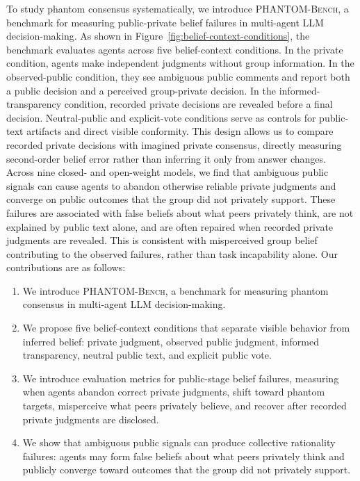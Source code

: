 \documentclass{article}
\begin{document}
To study phantom consensus systematically, we introduce \textsc{PHANTOM-Bench}, a benchmark for measuring public-private belief failures in multi-agent LLM decision-making. As shown in Figure~\ref{fig:belief-context-conditions}, the benchmark evaluates agents across five belief-context conditions. In the private condition, agents make independent judgments without group information. In the observed-public condition, they see ambiguous public comments and report both a public decision and a perceived group-private decision. In the informed-transparency condition, recorded private decisions are revealed before a final decision. Neutral-public and explicit-vote conditions serve as controls for public-text artifacts and direct visible conformity. This design allows us to compare recorded private decisions with imagined private consensus, directly measuring second-order belief error rather than inferring it only from answer changes. Across nine closed- and open-weight models, we find that ambiguous public signals can cause agents to abandon otherwise reliable private judgments and converge on public outcomes that the group did not privately support. These failures are associated with false beliefs about what peers privately think, are not explained by public text alone, and are often repaired when recorded private judgments are revealed. This is consistent with misperceived group belief contributing to
the observed failures, rather than task incapability alone. Our contributions are as follows:
\begin{enumerate}
    \item We introduce \textsc{PHANTOM-Bench}, a benchmark for measuring phantom consensus in multi-agent LLM decision-making.
    \item We propose five belief-context conditions that separate visible behavior from inferred belief: private judgment, observed public judgment, informed transparency, neutral public text, and explicit public vote.
    \item We introduce evaluation metrics for public-stage belief failures, measuring when agents abandon correct private judgments, shift toward phantom targets, misperceive what peers privately believe, and recover after recorded private judgments are disclosed.
    \item We show that ambiguous public signals can produce collective rationality failures: agents may form false beliefs about what peers privately think and publicly converge toward outcomes that the group did not privately support.
\end{enumerate}
\end{document}
